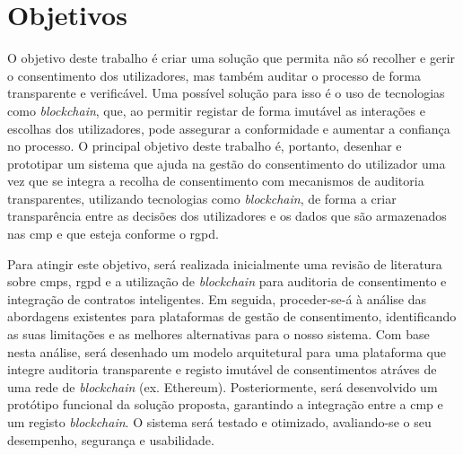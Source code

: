 \section{Objetivos}

O objetivo deste trabalho é criar uma solução que permita não só recolher e gerir o consentimento dos utilizadores, mas também auditar o processo de forma transparente e verificável. Uma possível solução para isso é o uso de tecnologias como \textit{blockchain}, que, ao permitir registar de forma imutável as interações e escolhas dos utilizadores, pode assegurar a conformidade e aumentar a confiança no processo. O principal objetivo deste trabalho é, portanto, desenhar e prototipar um sistema que ajuda na gestão do consentimento do utilizador uma vez que se integra a recolha de consentimento com mecanismos de auditoria transparentes, utilizando tecnologias como \textit{blockchain}, de forma a criar transparência entre as decisões dos utilizadores e os dados que são armazenados nas \acrshort{cmp} e que esteja conforme o \acrshort{rgpd}.

Para atingir este objetivo, será realizada inicialmente uma revisão de literatura sobre \acrshort{cmp}s, \acrshort{rgpd} e a utilização de \textit{blockchain} para auditoria de consentimento e integração de contratos inteligentes. Em seguida, proceder-se-á à análise das abordagens existentes para plataformas de gestão de consentimento, identificando as suas limitações e as melhores alternativas para o nosso sistema. Com base nesta análise, será desenhado um modelo arquitetural para uma plataforma que integre auditoria transparente e registo imutável de consentimentos atráves de uma rede de \textit{blockchain} (ex. Ethereum). Posteriormente, será desenvolvido um protótipo funcional da solução proposta, garantindo a integração entre a \acrshort{cmp} e um registo \textit{blockchain}. O sistema será testado e otimizado, avaliando-se o seu desempenho, segurança e usabilidade.




